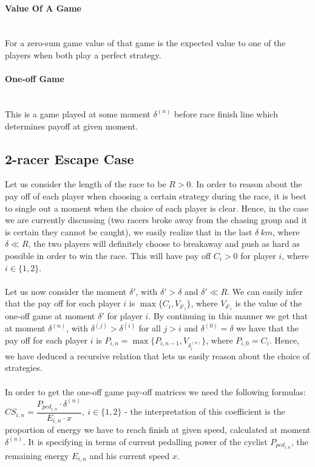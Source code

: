 \documentclass[10pt, a4paper]{report}
\begin{document}
\paragraph{Value Of A Game} ~\\
For a zero-sum game value of that game is the expected value to one of the players when both play a perfect strategy.

\paragraph{One-off Game} ~\\
This is a game played at some moment $\delta^{(n)}$ before race finish line which determines payoff at given moment.

\subsection{2-racer Escape Case}\label{subsec:zerosumgame}
Let us consider the length of the race to be $R > 0$. In order to reason about the pay off of each player when choosing a certain strategy during the race, it is best to single out a moment when the choice of each player is clear. Hence, in the case we are currently discussing (two racers broke away from the chasing group and it is certain they cannot be caught), we easily realize that in the last $\delta\ km$, where $\delta\ll R$, the two players will definitely choose to breakaway and push as hard as possible in order to win the race. This will have pay off $C_i>0$ for player $i$, where $i \in \{1,2\}$.
\\\\
Let us now consider the moment $\delta'$, with $\delta'>\delta$ and $\delta'\ll R$. We can easily infer that the pay off for each player $i$ is $\max\{C_i,V_{\delta'_i}\}$, where $V_{\delta'_i}$ is the value of the one-off game at moment $\delta'$ for player $i$. By continuing in this manner we get that at moment $\delta^{(n)}$, with $\delta^{(j)}>\delta^{(i)}$ for all $j>i$ and $\delta^{(0)}=\delta$ we have that the pay off for each player $i$ is $P_{i,n} = \max\{P_{i,n-1},V_{\delta^{(n)}_i}\}$, where $P_{i,0} = C_i$. Hence, we have deduced a recursive relation that lets us easily reason about the choice of strategies.
\\\\
In order to get the one-off game pay-off matrices we need the following formulas:\\
$CS_{i,n} = \dfrac{P_{ped_{i,n}} \cdot \delta^{(n)}}{E_{i,n} \cdot x},\ i\in\{1,2\}$ - the interpretation of this coefficient is the proportion of energy we have to reach finish at given speed, calculated at moment $\delta^{(n)}$. It is specifying in terms of current pedalling power of the cyclist $P_{ped_{i,n}}$, the remaining energy $E_{i,n}$ and his current speed $x$.\\\\
\end{document}
